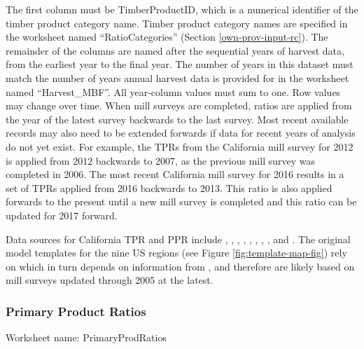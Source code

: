 \documentclass[
  openany]{book}
\begin{document}
The first column must be TimberProductID, which is a numerical identifier of the timber product category name. Timber product category names are specified in the worksheet named ``RatioCategories'' (Section \ref{own-prov-input-rc}). The remainder of the columns are named after the sequential years of harvest data, from the earliest year to the final year. The number of years in this dataset must match the number of years annual harvest data is provided for in the worksheet named ``Harvest\_MBF''. All year-column values must sum to one. Row values may change over time. When mill surveys are completed, ratios are applied from the year of the latest survey backwards to the last survey. Most recent available records may also need to be extended forwards if data for recent years of analysis do not yet exist. For example, the TPRs from the California mill survey for 2012 is applied from 2012 backwards to 2007, as the previous mill survey was completed in 2006. The most recent California mill survey for 2016 results in a set of TPRs applied from 2016 backwards to 2013. This ratio is also applied forwards to the present until a new mill survey is completed and this ratio can be updated for 2017 forward.

Data sources for California TPR and PPR include \textcite{barrette1970}, \textcite{hiserote1978}, \textcite{howard1974}, \textcite{marcille2020}, \textcite{mciver2015}, \textcite{morgan2004}, \textcite{morgan2012}, \textcite{ward1995}, and \textcite{ward1997}. The original model templates for the nine US regions (see Figure \ref{fig:template-map-fig}) rely on \textcite{smith2006} which in turn depends on information from \textcite{adams2006}, and therefore are likely based on mill surveys updated through 2005 at the latest.

\hypertarget{own-prov-input-ppr}{%
\subsubsection{Primary Product Ratios}\label{own-prov-input-ppr}}

Worksheet name: PrimaryProdRatios
\end{document}

